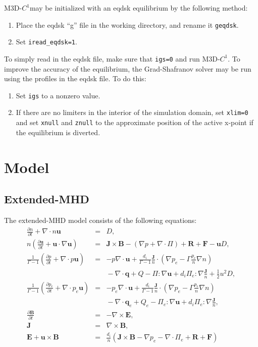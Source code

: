 \documentclass[letterpaper]{book}
\newcommand{\ddt}[1]{\frac{\partial #1}{\partial t}}
\renewcommand{\vec}[1]{\ensuremath{\mathbf{#1}}}
\newcommand{\tensor}[1]{\mathsf{#1}}
\newcommand{\B}{\vec{B}}
\newcommand{\E}{\vec{E}}
\newcommand{\R}{\vec{R}}
\renewcommand{\u}{\vec{u}}
\newcommand{\F}{\vec{F}}
\renewcommand{\j}{\vec{J}}
\newcommand{\q}{\vec{q}}
\newcommand{\jn}{\frac{\j}{n}}
\renewcommand{\P}{\tensor{\Pi}}
\newcommand{\codename}{M3D-$C^1$}
\renewcommand{\div}[1]{\nabla \cdot #1}
\newcommand{\curl}[1]{\nabla \times #1}
\newcommand{\dotdot}{:}
\begin{document}
\codename may be initialized with an eqdsk equilibrium by the following method:
\begin{enumerate}
\item Place the eqdsk ``g'' file in the working directory, and rename
  it \texttt{geqdsk}.
\item Set \texttt{iread\_eqdsk=1}.
\end{enumerate}
To simply read in the eqdsk file, make sure that \texttt{igs=0} and
run \codename.  To improve the accuracy of the equilibrium, the
Grad-Shafranov solver may be run using the profiles in the eqdsk
file.  To do this:
\begin{enumerate}
\item Set \texttt{igs} to a nonzero value.
\item If there are no limiters in the interior of the simulation
  domain, set \texttt{xlim=0} and set \texttt{xnull} and \texttt{znull}
  to the approximate position of the active x-point if the equilibrium
  is diverted.
\end{enumerate}



\chapter{Model}

\section{Extended-MHD}

The extended-MHD model consists of the following equations:
\begin{subequations} \label{eq:xmhd}
\begin{eqnarray}
  \label{eq:continuity}
  \ddt{n} + \div n \u & = & D,
  \\
  \label{eq:momentum}
  n \left( \ddt{\u} + \u \cdot \nabla \u \right) 
  & = & \j \times \B - (\nabla p + \div \P) + \R + \F - \u D,
  \\
  \frac{1}{\Gamma-1} \left( \ddt{p} + \div{p\u} \right)
  & = & -p \div\u +
  \frac{d_i}{\Gamma-1}\jn\cdot\left(\nabla p_e -
  \Gamma \frac{p_e}{n}\nabla n \right)
  \\ & & \mbox{}
  - \div{\q} + Q - \P\dotdot\nabla \u + d_i \P_e\dotdot\nabla \jn + \frac{1}{2} u^2 D,
  \nonumber \\
  \frac{1}{\Gamma-1} \left( \ddt{p_e} + \div{p_e\u} \right)
  & = & -p_e \div\u +
  \frac{d_i}{\Gamma-1}\jn\cdot\left(\nabla p_e -
  \Gamma \frac{p_e}{n}\nabla n \right)
  \\ & & \mbox{} 
  - \div{\q_e} + Q_e - \P_e\dotdot\nabla \u + d_i \P_e\dotdot\nabla \jn,
  \nonumber 
  \\
  \label{eq:Faraday}
  \ddt{\B} & = & -\curl \E,
  \\
  \j & = &\curl \B,
  \\
  \label{eq:ohm}
  \E + \u \times \B & = &  
  \frac{d_i}{n} \left(\j\times\B - \nabla p_e 
  - \div{\P_e} + \R + \F \right)
\end{eqnarray}
\end{subequations}
\end{document}
